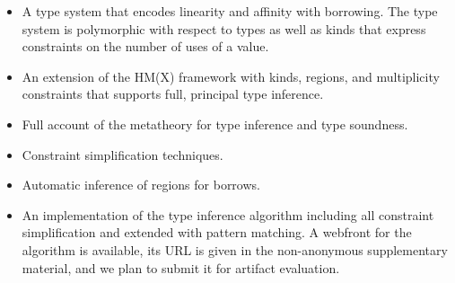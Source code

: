\begin{itemize}
\item A type system that encodes linearity and affinity with
  borrowing. The type system is polymorphic with respect to types as
  well as kinds that express constraints on the number of uses of a value.
\item An extension of the HM(X) framework
  \cite{DBLP:journals/tapos/OderskySW99} with kinds, regions, and
  multiplicity constraints that supports full, principal type inference.
\item Full account of the metatheory for type inference and type soundness.
\item Constraint simplification techniques.
\item Automatic inference of regions for borrows.
\item An implementation of the type inference algorithm including all
  constraint simplification and extended with pattern matching. A
  webfront for the algorithm is available, its URL is given in the
  non-anonymous supplementary material, and we plan to submit it for
  artifact evaluation.
\end{itemize}

